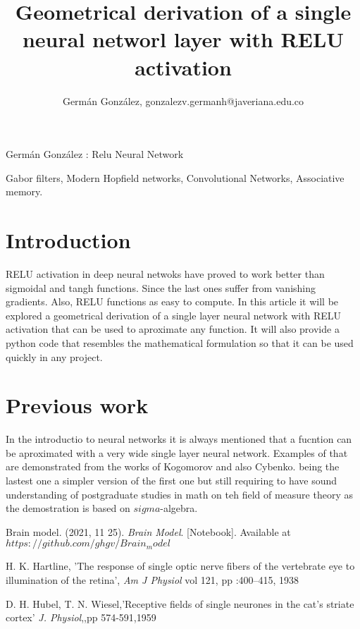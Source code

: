 \documentclass[journal]{IEEEtai}
\begin{document}
\title{Geometrical derivation of a single neural networl layer with RELU activation } 


\author{Germán González, gonzalezv.germanh@javeriana.edu.co }


{Germán González : Relu Neural Network}

\maketitle
\captionsetup{font=footnotesize,justification=justified}
\begin{abstract}

\end{abstract}
  
 

\begin{IEEEkeywords}
Gabor filters, Modern Hopfield networks, Convolutional Networks, Associative memory.
\end{IEEEkeywords}


\section{Introduction}
RELU activation in deep neural netwoks have proved to work better than sigmoidal and tangh functions.  Since  the last ones suffer from vanishing gradients. Also, RELU functions as easy to compute. In this article it will be explored a geometrical derivation of a single layer neural network with RELU activation that can be used to aproximate any function. It will also provide a python code that resembles the mathematical formulation so that it can be used quickly in any project.

\section{Previous work}
In the introductio to neural networks it is always mentioned that a fucntion can be aproximated with a very wide single layer neural network. Examples of that are demonstrated from the works of Kogomorov and also Cybenko. being the lastest one a simpler version of the first one but still requiring to have sound understanding of postgraduate studies in math on teh field of measure theory as the demostration is based on $sigma$-algebra.



\begin{thebibliography}{34}
\setcounter{enumiv}{0}

 Brain model. (2021, 11 25). {\em Brain Model}. [Notebook]. Available at $https://github.com/ghgv/Brain_model$

 H. K. Hartline, 'The response of single optic nerve fibers of the vertebrate eye to illumination of the retina', {\em Am J Physiol} vol 121, pp :400–415, 1938

 D. H. Hubel, T. N. Wiesel,'Receptive fields of single neurones in the cat's striate cortex' {\em J. Physiol},,pp 574-591,1959


\end{thebibliography}
\
\end{document}

